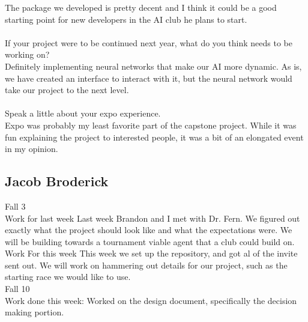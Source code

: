 \documentclass[10pt,letterpaper,onecolumn,draftclsnofoot]{IEEEtran}
\begin{document}
The package we developed is pretty decent and I think it could be a good starting point for new developers in the AI club he plans to start.\\
\\
If your project were to be continued next year, what do you think needs to be working on?\\
Definitely implementing neural networks that make our AI more dynamic. As is, we have created an interface to interact with it, but the neural network would take our project to the next level.\\
\\
Speak a little about your expo experience.\\
Expo was probably my least favorite part of the capstone project. While it was fun explaining the project to interested people, it was a bit of an elongated event in my opinion.
\subsection{Jacob Broderick}
Fall 3\\
Work for last week Last week Brandon and I met with Dr. Fern. We figured out exactly what the project should look like and what the expectations were. We will be building towards a tournament viable agent that a club could build on.\\

Work For this week This week we set up the repository, and got al of the invite sent out. We will work on hammering out details for our project, such as the starting race we would like to use.\\
Fall 10\\
Work done this week: Worked on the design document, specifically the decision making portion.\\
\end{document}
